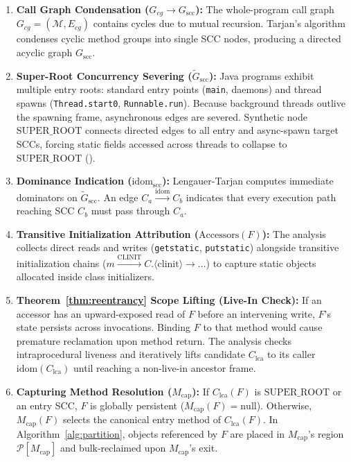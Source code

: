 \documentclass[12pt,a4paper]{article}
\newcommand{\GLOBAL}{\text{GLOBAL}}
\newcommand{\idom}{\text{idom}}
\begin{document}
\begin{enumerate}[leftmargin=*]
  \item \textbf{Call Graph Condensation ($G_{cg} \to G_{\text{scc}}$):} The whole-program call graph $G_{cg} = (\mathcal{M}, E_{cg})$ contains cycles due to mutual recursion. Tarjan's algorithm condenses cyclic method groups into single SCC nodes, producing a directed acyclic graph $G_{\text{scc}}$.
  \item \textbf{Super-Root Concurrency Severing ($\widetilde{G}_{\text{scc}}$):} Java programs exhibit multiple entry roots: standard entry points (\texttt{main}, daemons) and thread spawns (\texttt{Thread.start0}, \texttt{Runnable.run}). Because background threads outlive the spawning frame, asynchronous edges are severed. Synthetic node $\text{SUPER\_ROOT}$ connects directed edges to all entry and async-spawn target SCCs, forcing static fields accessed across threads to collapse to $\text{SUPER\_ROOT}$ (\GLOBAL{}).
  \item \textbf{Dominance Indication ($\idom_{\text{scc}}$):} Lengauer-Tarjan computes immediate dominators on $\widetilde{G}_{\text{scc}}$. An edge $C_a \xrightarrow{\idom} C_b$ indicates that every execution path reaching SCC $C_b$ must pass through $C_a$.
  \item \textbf{Transitive Initialization Attribution ($\text{Accessors}(F)$):} The analysis collects direct reads and writes (\texttt{getstatic}, \texttt{putstatic}) alongside transitive initialization chains ($m \xrightarrow{\text{CLINIT}} C.\langle\text{clinit}\rangle \to \dots$) to capture static objects allocated inside class initializers.
  \item \textbf{Theorem~\ref{thm:reentrancy} Scope Lifting (Live-In Check):} If an accessor has an upward-exposed read of $F$ before an intervening write, $F$'s state persists across invocations. Binding $F$ to that method would cause premature reclamation upon method return. The analysis checks intraprocedural liveness and iteratively lifts candidate $C_{\text{lca}}$ to its caller $\idom(C_{\text{lca}})$ until reaching a non-live-in ancestor frame.
  \item \textbf{Capturing Method Resolution ($M_{\text{cap}}$):} If $C_{\text{lca}}(F)$ is $\text{SUPER\_ROOT}$ or an entry SCC, $F$ is globally persistent ($M_{\text{cap}}(F) = \text{null}$). Otherwise, $M_{\text{cap}}(F)$ selects the canonical entry method of $C_{\text{lca}}(F)$. In Algorithm~\ref{alg:partition}, objects referenced by $F$ are placed in $M_{\text{cap}}$'s region $\mathcal{P}[M_{\text{cap}}]$ and bulk-reclaimed upon $M_{\text{cap}}$'s exit.
\end{enumerate}
\end{document}

